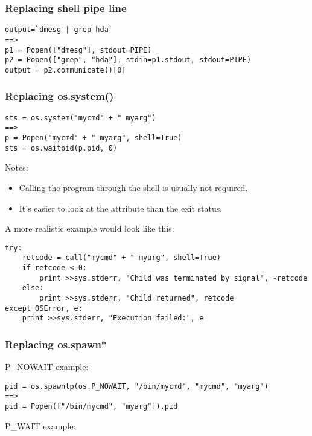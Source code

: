 \subsubsection{Replacing shell pipe line}

\begin{verbatim}
output=`dmesg | grep hda`
==>
p1 = Popen(["dmesg"], stdout=PIPE)
p2 = Popen(["grep", "hda"], stdin=p1.stdout, stdout=PIPE)
output = p2.communicate()[0]
\end{verbatim}

\subsubsection{Replacing os.system()}

\begin{verbatim}
sts = os.system("mycmd" + " myarg")
==>
p = Popen("mycmd" + " myarg", shell=True)
sts = os.waitpid(p.pid, 0)
\end{verbatim}

Notes:

\begin{itemize}
\item Calling the program through the shell is usually not required.
\item It's easier to look at the  attribute than
      the exit status.
\end{itemize}

A more realistic example would look like this:

\begin{verbatim}
try:
    retcode = call("mycmd" + " myarg", shell=True)
    if retcode < 0:
        print >>sys.stderr, "Child was terminated by signal", -retcode
    else:
        print >>sys.stderr, "Child returned", retcode
except OSError, e:
    print >>sys.stderr, "Execution failed:", e
\end{verbatim}

\subsubsection{Replacing os.spawn*}

P_NOWAIT example:

\begin{verbatim}
pid = os.spawnlp(os.P_NOWAIT, "/bin/mycmd", "mycmd", "myarg")
==>
pid = Popen(["/bin/mycmd", "myarg"]).pid
\end{verbatim}

P_WAIT example:

